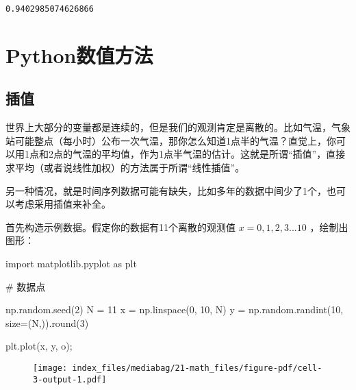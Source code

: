 \documentclass[
  letterpaper,
  DIV=11,
  numbers=noendperiod]{scrreprt}
\newenvironment{Shaded}{\begin{snugshade}}{\end{snugshade}}
\newcommand{\BuiltInTok}[1]{\textcolor[rgb]{0.00,0.23,0.31}{#1}}
\newcommand{\CommentTok}[1]{\textcolor[rgb]{0.37,0.37,0.37}{#1}}
\newcommand{\DecValTok}[1]{\textcolor[rgb]{0.68,0.00,0.00}{#1}}
\newcommand{\ImportTok}[1]{\textcolor[rgb]{0.00,0.46,0.62}{#1}}
\newcommand{\NormalTok}[1]{\textcolor[rgb]{0.00,0.23,0.31}{#1}}
\newcommand{\OperatorTok}[1]{\textcolor[rgb]{0.37,0.37,0.37}{#1}}
\newcommand{\StringTok}[1]{\textcolor[rgb]{0.13,0.47,0.30}{#1}}
\begin{document}
\begin{verbatim}
0.9402985074626866
\end{verbatim}

\hypertarget{pythonux6570ux503cux65b9ux6cd5}{%
\chapter{Python数值方法}\label{pythonux6570ux503cux65b9ux6cd5}}

\hypertarget{ux63d2ux503c}{%
\section{插值}\label{ux63d2ux503c}}

世界上大部分的变量都是连续的，但是我们的观测肯定是离散的。比如气温，气象站可能整点（每小时）公布一次气温，那你怎么知道1点半的气温？直觉上，你可以用1点和2点的气温的平均值，作为1点半气温的估计。这就是所谓``插值''，直接求平均（或者说线性加权）的方法属于所谓``线性插值''。

另一种情况，就是时间序列数据可能有缺失，比如多年的数据中间少了1个，也可以考虑采用插值来补全。

首先构造示例数据。假定你的数据有11个离散的观测值 \(x =0,1,2,3 ... 10\)
，绘制出图形：

\begin{Shaded}
\begin{Highlighting}[]
\ImportTok{import}\NormalTok{ matplotlib.pyplot }\ImportTok{as}\NormalTok{ plt}

\CommentTok{\# 数据点}

\NormalTok{np.random.seed(}\DecValTok{2}\NormalTok{)}
\NormalTok{N }\OperatorTok{=} \DecValTok{11}
\NormalTok{x }\OperatorTok{=}\NormalTok{ np.linspace(}\DecValTok{0}\NormalTok{, }\DecValTok{10}\NormalTok{, N) }
\NormalTok{y }\OperatorTok{=}\NormalTok{ np.random.randint(}\DecValTok{10}\NormalTok{, size}\OperatorTok{=}\NormalTok{(N,)).}\BuiltInTok{round}\NormalTok{(}\DecValTok{3}\NormalTok{)}

\NormalTok{plt.plot(x, y, }\StringTok{\textquotesingle{}o\textquotesingle{}}\NormalTok{)}\OperatorTok{;}
\end{Highlighting}
\end{Shaded}

\begin{figure}[H]

{\centering \texttt{[image: index\_files/mediabag/21-math\_files/figure-pdf/cell-3-output-1.pdf]}

}

\end{figure}
\end{document}
